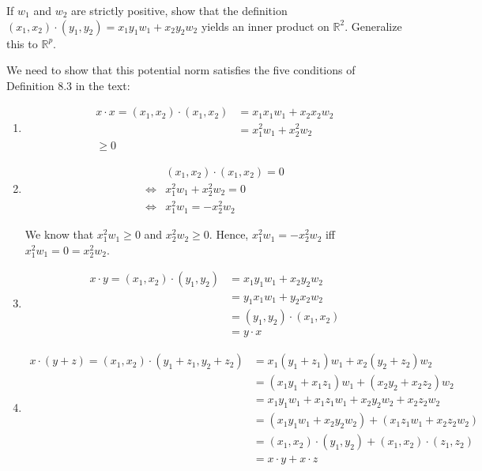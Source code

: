 \documentclass[12pt]{article}
\newenvironment{problem}[2][Problem]{\begin{trivlist}
\item[\hskip \labelsep {\bfseries #1}\hskip \labelsep {\bfseries #2.}]}{\end{trivlist}}
\begin{document}
\begin{problem}{8.D} If $w_1$ and $w_2$ are strictly positive, show that the definition $(x_1, x_2) \cdot (y_1, y_2) = x_1y_1w_1 + x_2y_2w_2$ yields an inner product on $\mathbb{R}^2$. Generalize this to $\mathbb{R}^p$.
\end{problem}

We need to show that this potential norm satisfies the five conditions of Definition 8.3 in the text:

\begin{enumerate}

\item \begin{align*}
x \cdot x = (x_1, x_2) \cdot (x_1, x_2) &= x_1x_1w_1 + x_2x_2w_2\\
&= x_1^2w_1 + x_2^2w_2\\
\geq 0
\end{align*}

\item \begin{align*}
&(x_1, x_2) \cdot (x_1, x_2) = 0\\
\iff &x_1^2w_1 + x_2^2w_2 = 0\\
\iff &x_1^2w_1 = -x_2^2w_2
\end{align*}

We know that $x_1^2w_1 \geq 0$ and $x_2^2w_2 \geq 0$. Hence, $x_1^2w_1 = -x_2^2w_2$ iff $x_1^2w_1 = 0 = x_2^2w_2$.

\item \begin{align*}
x \cdot y = (x_1, x_2) \cdot (y_1, y_2) &= x_1y_1w_1 + x_2y_2w_2\\
&= y_1x_1w_1 + y_2x_2w_2\\
&= (y_1, y_2) \cdot (x_1, x_2)\\
&= y \cdot x
\end{align*}

\item \begin{align*}
x \cdot (y + z) = (x_1, x_2) \cdot (y_1 + z_1, y_2 + z_2) &= x_1(y_1 + z_1)w_1 + x_2(y_2 + z_2)w_2\\
&= (x_1y_1 + x_1z_1)w_1 + (x_2y_2 + x_2z_2)w_2\\
&= x_1y_1w_1 + x_1z_1w_1 + x_2y_2w_2 + x_2z_2w_2\\
&= (x_1y_1w_1 + x_2y_2w_2) + (x_1z_1w_1 + x_2z_2w_2)\\
&= (x_1, x_2) \cdot (y_1, y_2) + (x_1, x_2) \cdot (z_1, z_2)\\
&= x \cdot y + x \cdot z
\end{align*}


\end{enumerate}
\end{document}
